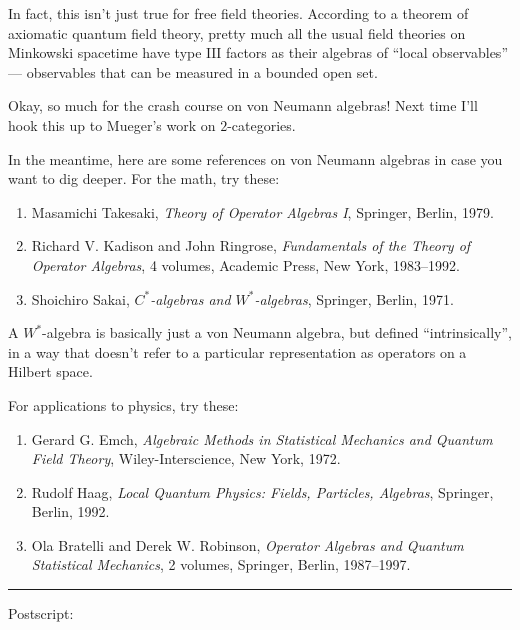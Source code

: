 \documentclass{article}
\begin{document}
In fact, this isn't just true for free field theories. According to a
theorem of axiomatic quantum field theory, pretty much all the usual
field theories on Minkowski spacetime have type \(\mathrm{III}\) factors
as their algebras of ``local observables'' --- observables that can be
measured in a bounded open set.

Okay, so much for the crash course on von Neumann algebras! Next time
I'll hook this up to Mueger's work on \(2\)-categories.

In the meantime, here are some references on von Neumann algebras in
case you want to dig deeper. For the math, try these:

\begin{enumerate}
\def\labelenumi{\arabic{enumi})}
\setcounter{enumi}{4}
\item
  Masamichi Takesaki, \emph{Theory of Operator Algebras I}, Springer,
  Berlin, 1979.
\item
  Richard V. Kadison and John Ringrose, \emph{Fundamentals of the Theory
  of Operator Algebras}, 4 volumes, Academic Press, New York,
  1983--1992.
\item
  Shoichiro Sakai, \emph{\(C^*\)-algebras and \(W^*\)-algebras},
  Springer, Berlin, 1971.
\end{enumerate}

A \(W^*\)-algebra is basically just a von Neumann algebra, but defined
``intrinsically'', in a way that doesn't refer to a particular
representation as operators on a Hilbert space.

For applications to physics, try these:

\begin{enumerate}
\def\labelenumi{\arabic{enumi})}
\setcounter{enumi}{7}
\item
  Gerard G. Emch, \emph{Algebraic Methods in Statistical Mechanics and
  Quantum Field Theory}, Wiley-Interscience, New York, 1972.
\item
  Rudolf Haag, \emph{Local Quantum Physics: Fields, Particles,
  Algebras}, Springer, Berlin, 1992.
\item
  Ola Bratelli and Derek W. Robinson, \emph{Operator Algebras and
  Quantum Statistical Mechanics}, 2 volumes, Springer, Berlin,
  1987--1997.
\end{enumerate}

\begin{center}\rule{0.5\linewidth}{0.5pt}\end{center}

Postscript:
\end{document}
